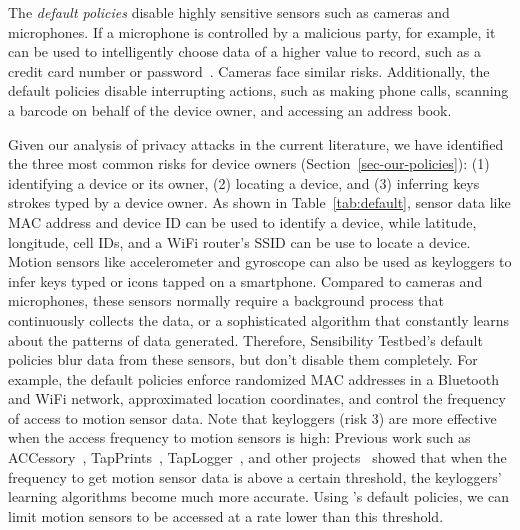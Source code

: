 The \textit{default policies} disable highly sensitive sensors 
such as cameras and microphones. 
If a microphone is controlled by a malicious party, for example, it can be used to 
intelligently choose data of a higher value to record, such as a credit card 
number or password~\cite{zhang2015leave}. Cameras face similar
risks. Additionally, the default policies disable interrupting actions, such as 
making phone calls, scanning a barcode on behalf of the device owner, 
and accessing an address book. 

Given our analysis of privacy attacks in the current literature, 
we have identified the three 
most common 
risks for device owners (Section~\ref{sec-our-policies}): (1) identifying a device or its owner, 
(2) locating a device, and (3) inferring keys strokes typed by a device owner. 
As shown in Table~\ref{tab:default}, 
sensor data like MAC address and device ID can be used to identify a device, while latitude, longitude, cell 
IDs, and a WiFi router's SSID can be use to locate a 
device. Motion sensors like accelerometer and gyroscope can also be used
as keyloggers to infer keys typed or icons tapped on a 
smartphone. Compared to cameras and microphones, these 
sensors normally require a background process that continuously 
collects the data, or a sophisticated algorithm that constantly learns 
about the patterns of data generated. 
Therefore, Sensibility Testbed's default policies 
blur data from these sensors, but don't disable them completely. 
For example, the default policies enforce randomized MAC addresses in a 
Bluetooth and WiFi network, approximated location coordinates, and 
control the frequency of access to motion sensor data. Note that keyloggers (risk 3)
are more effective when the access frequency to motion sensors is 
high: Previous work such as ACCessory~\cite{owusu2012accessory}, 
TapPrints~\cite{miluzzo2012tapprints}, TapLogger~\cite{xu2012taplogger}, 
and other projects~\cite{aviv2012practicality} showed that when the 
frequency to get motion sensor data is above a certain threshold, the keyloggers' 
learning algorithms become much more accurate.  
Using \sysname's default policies, we can limit 
motion sensors to be accessed at a rate lower than this threshold. 



